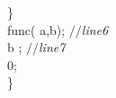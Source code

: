 \documentclass[compress]{beamer}
\begin{document}
{\begin{small}
{{\begin{flushleft}
\hspace*{3\indentation}\}   \mbox{}\\
\hspace*{3\indentation}func( a,b);                                                      \hfill{\em $//$\hspace*{1\indentation}line\hspace*{1\indentation}6\hspace*{1\indentation}}\mbox{}\\
\hspace*{3\indentation}{\bf delete []} b ;                                                      \hfill{\em $//$\hspace*{1\indentation}line\hspace*{1\indentation}7\hspace*{1\indentation}}\mbox{}\\

\hspace*{2\indentation}{\bf return\/} 0;\mbox{}\\
\}\mbox{}\\
\end{flushleft}}
}
\end{small}
}
\end{document}
